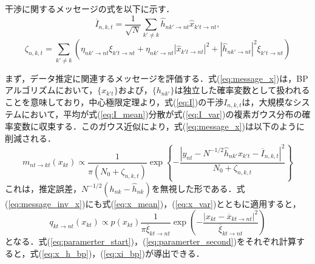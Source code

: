 干渉に関するメッセージの式を以下に示す．
\begin{equation}
	\label{eq:I_mean}
	\overline{I}_{n,k,t}=
		\frac{1}{\sqrt{N}}
		\sum_{k'\neq k}
			\hat{h}_{nk'\to nt}\hat{x}_{k't\to nt}, 
\end{equation}
\begin{equation}
	\label{eq:I_var}
	\zeta_{n,k,t}=
		\sum_{k'\neq k}
			\left(
				\eta_{nk'\to nt}\xi_{k't\to nt}
				+
				\eta_{nk'\to nt}|\hat{x}_{k't\to nt}|^{2}
				+
				|\hat{h}_{nk'\to nt}|^{2}\xi_{k't\to nt}
			\right)
\end{equation}

まず，データ推定に関連するメッセージを評価する．式(\ref{eq:message_x})は，BPアルゴリズムにおいて，$\{x_{k't}\}$および，$\{h_{nk'}\}$は独立した確率変数として扱われることを意味しており，中心極限定理より，式(\ref{eq:I})の干渉$I_{n,k,t}$は，大規模なシステムにおいて，平均が式(\ref{eq:I_mean})分散が式(\ref{eq:I_var})の複素ガウス分布の確率変数に収束する．このガウス近似により，式(\ref{eq:message_x})は以下のように削減される．
\begin{equation}
	m_{nt\to kt}(x_{kt}) \propto 
		\frac{1}{\pi\left(N_0 + \zeta_{n,k,t}\right)}
		\exp
		\left\{
			-\frac
				{|y_{nt}-N^{-1/2}\hat{h}_{nk'}x_{k't}-\overline{I}_{n,k,t}|^2}
				{N_0+\zeta_{n,k,t}}
		\right\}
\end{equation}
これは，推定誤差，$N^{-1/2}(h_{nk}-\hat{h}_{nk})$を無視した形である．式(\ref{eq:message_inv_x})にも式(\ref{eq:x_mean})，(\ref{eq:x_var})とともに適用すると，
\begin{equation}
	q_{kt\to nt}(x_{kt}) \propto 
		p(x_{kt})
		\frac{1}{\pi \overline{\xi}_{kt\to nt}}
		\exp
			\left(
				-\frac{|x_{kt}-\overline{x}_{kt\to nt}|^2}{\overline{\xi}_{kt\to nt}}
			\right)
\end{equation}
となる．式(\ref{eq:paramerter_start})，(\ref{eq:paramerter_second})をそれぞれ計算すると，式(\ref{eq:x_h_bp})，(\ref{eq:xi_bp})が導出できる．

